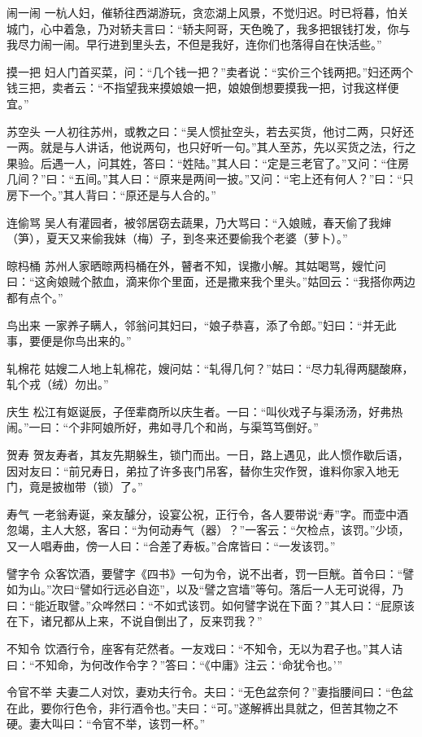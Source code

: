 \documentclass[12pt,UTF8]{ctexbook}
\begin{document}
闹一闹
一杭人妇，催轿往西湖游玩，贪恋湖上风景，不觉归迟。时已将暮，怕关城门，心中着急，乃对轿夫言曰：“轿夫阿哥，天色晚了，我多把银钱打发，你与我尽力闹一闹。早行进到里头去，不但是我好，连你们也落得自在快活些。”

摸一把
妇人门首买菜，问：“几个钱一把？”卖者说：“实价三个钱两把。”妇还两个钱三把，卖者云：“不指望我来摸娘娘一把，娘娘倒想要摸我一把，讨我这样便宜。”

苏空头
一人初往苏州，或教之曰：“吴人惯扯空头，若去买货，他讨二两，只好还一两。就是与人讲话，他说两句，也只好听一句。”其人至苏，先以买货之法，行之果验。后遇一人，问其姓，答曰：“姓陆。”其人曰：“定是三老官了。”又问：“住房几间？”曰：“五间。”其人曰：“原来是两间一披。”又问：“宅上还有何人？”曰：“只房下一个。”其人背曰：“原还是与人合的。”

连偷骂
吴人有灌园者，被邻居窃去蔬果，乃大骂曰：“入娘贼，春天偷了我婶（笋），夏天又来偷我妹（梅）子，到冬来还要偷我个老婆（萝卜）。”

晾杩桶
苏州人家晒晾两杩桶在外，瞽者不知，误撒小解。其姑喝骂，嫂忙问曰：“这肏娘贼个脓血，滴来你个里面，还是撒来我个里头。”姑回云：“我搭你两边都有点个。”

鸟出来
一家养子瞒人，邻翁问其妇曰，“娘子恭喜，添了令郎。”妇曰：“并无此事，要便是你鸟出来的。”

轧棉花
姑嫂二人地上轧棉花，嫂问姑：“轧得几何？”姑曰：“尽力轧得两腿酸麻，轧个戎（绒）勿出。”

庆生
松江有妪诞辰，子侄辈商所以庆生者。一曰：“叫伙戏子与渠汤汤，好弗热闹。”一曰：“个非阿娘所好，弗如寻几个和尚，与渠笃笃倒好。”

贺寿
贺友寿者，其友先期躲生，锁门而出。一日，路上遇见，此人惯作歇后语，因对友曰：“前兄寿日，弟拉了许多丧门吊客，替你生灾作贺，谁料你家入地无门，竟是披枷带（锁）了。”

寿气
一老翁寿诞，亲友醵分，设宴公祝，正行令，各人要带说“寿”字。而壶中酒忽竭，主人大怒，客曰：“为何动寿气（器）？”一客云：“欠检点，该罚。”少顷，又一人唱寿曲，傍一人曰：“合差了寿板。”合席皆曰：“一发该罚。”

譬字令
众客饮酒，要譬字《四书》一句为令，说不出者，罚一巨觥。首令曰：“譬如为山。”次曰“譬如行远必自迩”，以及“譬之宫墙”等句。落后一人无可说得，乃曰：“能近取譬。”众哗然曰：“不如式该罚。如何譬字说在下面？”其人曰：“屁原该在下，诸兄都从上来，不说自倒出了，反来罚我？”

不知令
饮酒行令，座客有茫然者。一友戏曰：“不知令，无以为君子也。”其人诘曰：“不知命，为何改作令字？”答曰：“《中庸》注云：‘命犹令也。’”

令官不举
夫妻二人对饮，妻劝夫行令。夫曰：“无色盆奈何？”妻指腰间曰：“色盆在此，要你行色令，非行酒令也。”夫曰：“可。”遂解裤出具就之，但苦其物之不硬。妻大叫曰：“令官不举，该罚一杯。”
\end{document}
